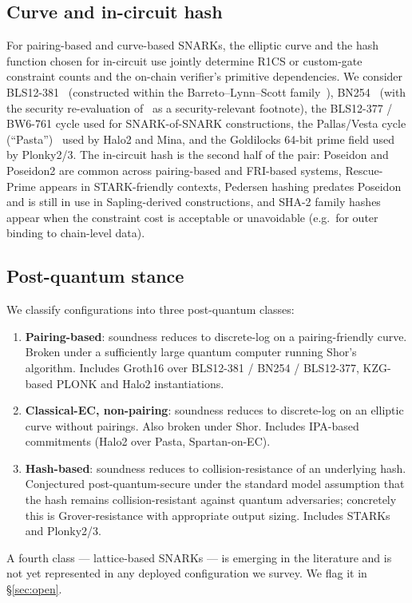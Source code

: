 \subsection{Curve and in-circuit hash}
\label{sec:dim-curve}

For pairing-based and curve-based SNARKs, the elliptic curve and the
hash function chosen for in-circuit use jointly determine R1CS or
custom-gate constraint counts and the on-chain verifier's primitive
dependencies. We consider BLS12-381~\cite{bowe-2017-bls12381}
(constructed within the Barreto--Lynn--Scott
family~\cite{barreto-2003-bls}),
BN254~\cite{barreto-2005-bn254} (with the security re-evaluation
of~\cite{kim-barbulescu-2016} as a security-relevant footnote), the
BLS12-377 / BW6-761 cycle used for SNARK-of-SNARK constructions, the
Pallas/Vesta cycle (``Pasta'')~\cite{hopwood-2020-pasta} used by Halo2
and Mina, and the Goldilocks 64-bit prime field used by Plonky2/3.
The in-circuit hash is the second half of the pair: Poseidon and
Poseidon2 are common across pairing-based and FRI-based systems,
Rescue-Prime appears in STARK-friendly contexts, Pedersen hashing
predates Poseidon and is still in use in Sapling-derived constructions,
and SHA-2 family hashes appear when the constraint cost is acceptable
or unavoidable (e.g.\ for outer binding to chain-level data).

\subsection{Post-quantum stance}
\label{sec:dim-pq}

We classify configurations into three post-quantum classes:
\begin{enumerate}
  \item \textbf{Pairing-based}: soundness reduces to discrete-log on a
    pairing-friendly curve. Broken under a sufficiently large quantum
    computer running Shor's algorithm. Includes Groth16 over
    BLS12-381 / BN254 / BLS12-377, KZG-based PLONK and Halo2
    instantiations.
  \item \textbf{Classical-EC, non-pairing}: soundness reduces to
    discrete-log on an elliptic curve without pairings. Also broken
    under Shor. Includes IPA-based commitments
    (Halo2 over Pasta, Spartan-on-EC).
  \item \textbf{Hash-based}: soundness reduces to collision-resistance
    of an underlying hash. Conjectured post-quantum-secure under the
    standard model assumption that the hash remains
    collision-resistant against quantum adversaries; concretely this
    is Grover-resistance with appropriate output sizing. Includes
    STARKs and Plonky2/3.
\end{enumerate}
A fourth class --- lattice-based SNARKs --- is emerging in the
literature and is not yet represented in any deployed configuration we
survey. We flag it in \S\ref{sec:open}.

